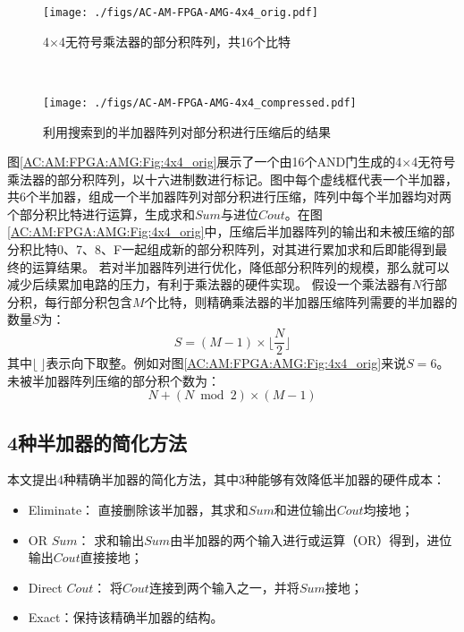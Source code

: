 \begin{figure}[!h]
    \begin{minipage}[t]{0.45\linewidth}
      \centering
      \texttt{[image: ./figs/AC-AM-FPGA-AMG-4x4\_orig.pdf]}
      \caption{4$\times$4无符号乘法器的部分积阵列，共16个比特}
      \label{AC:AM:FPGA:AMG:Fig:4x4_orig}
    \end{minipage}
    \ \ \
    \begin{minipage}[t]{0.45\linewidth}
      \centering
      \texttt{[image: ./figs/AC-AM-FPGA-AMG-4x4\_compressed.pdf]}
      \caption{利用搜索到的半加器阵列对部分积进行压缩后的结果}
      \label{AC:AM:FPGA:AMG:Fig:4x4_compressed}
    \end{minipage}
\end{figure}
图\ref{AC:AM:FPGA:AMG:Fig:4x4_orig}展示了一个由16个AND门生成的4$\times$4无符号乘法器的部分积阵列，以十六进制数进行标记。图中每个虚线框代表一个半加器，共6个半加器，组成一个半加器阵列对部分积进行压缩，阵列中每个半加器均对两个部分积比特进行运算，生成求和$Sum$与进位$Cout$。在图\ref{AC:AM:FPGA:AMG:Fig:4x4_orig}中，压缩后半加器阵列的输出和未被压缩的部分积比特0、7、8、F一起组成新的部分积阵列，对其进行累加求和后即能得到最终的运算结果。
若对半加器阵列进行优化，降低部分积阵列的规模，那么就可以减少后续累加电路的压力，有利于乘法器的硬件实现。
假设一个乘法器有$N$行部分积，每行部分积包含$M$个比特，则精确乘法器的半加器压缩阵列需要的半加器的数量$S$为：
\begin{equation}
    \label{AC:AM:FPGA:AMG:Eq:HA_number}
    S = (M-1) \times \lfloor \frac{N}{2} \rfloor
\end{equation}
其中$\lfloor \ \rfloor$表示向下取整。例如对图\ref{AC:AM:FPGA:AMG:Fig:4x4_orig}来说$S=6$。未被半加器阵列压缩的部分积个数为：
\begin{equation}
    \label{AC:AM:FPGA:AMG:Eq:Uncompress_number}
    N + (N \bmod 2) \times (M-1)
\end{equation}

\subsection{4种半加器的简化方法}

本文提出4种精确半加器的简化方法，其中3种能够有效降低半加器的硬件成本：
\begin{itemize}
    \item Eliminate： 直接删除该半加器，其求和$Sum$和进位输出$Cout$均接地；
    \item OR $Sum$： 求和输出$Sum$由半加器的两个输入进行或运算（OR）得到，进位输出$Cout$直接接地；
    \item Direct $Cout$： 将$Cout$连接到两个输入之一，并将$Sum$接地；
    \item Exact：保持该精确半加器的结构。
\end{itemize}

